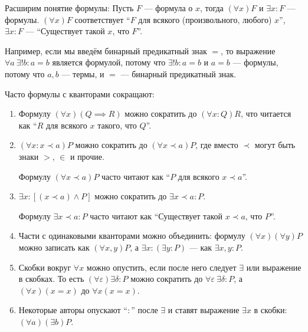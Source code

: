 Расширим понятие формулы: Пусть $F$ --- формула о $x$, тогда ${(\forall x)F}$
и ${\exists x:F}$ --- формулы. $(\forall x)F$ соответствует
``$F$ для всякого (произвольного, любого) $x$'', $\exists x:F$ ---
``Существует такой $x$, что $F$''.

Например, если мы введём бинарный предикатный знак $=$, то выражение
$\forall a~\exists!b:a=b$ является формулой, потому что ${\exists! b:a=b}$ и
${a=b}$ --- формулы, потому что $a,b$ --- термы, и $=$ --- бинарный предикатный знак.

Часто формулы с кванторами сокращают:
\begin{fullwidth}
	\begin{multicols}{2}
		\begin{enumerate}
			\item{}Формулу ${(\forall x)(Q\implies R)}$ можно сократить
			до ${(\forall x:Q)R}$, что читается как ``$R$ для всякого $x$ такого,
			что $Q$''.

			\item{}${(\forall x:x\prec a)P}$ можно сократить до ${(\forall x\prec a)P}$,
			где вместо $\prec$ могут быть знаки $>$, $\in$ и прочие.

			Формулу ${(\forall x\prec a)P}$ часто читают как
			``$P$ для всякого $x\prec a$''.

			\item{}$\exists x:[(x\prec a)\land P]$ можно сократить
			до $\exists x\prec a:P$.

			Формулу ${\exists x\prec a:P}$ часто читают как
			``Существует такой $x\prec a$, что $P$''.

			\columnbreak

			\item{}Части с одинаковыми кванторами можно объединить:
			формулу $(\forall x)(\forall y)P$ можно записать как $(\forall x,y)P$,
			а ${\exists x:(\exists y:P)}$ --- как $\exists x,y:P$.

			\item{}Скобки вокруг $\forall x$ можно опустить,
			если после него следует $\exists$ или выражение в скобках.
			То есть ${(\forall \varepsilon)\exists \delta:P}$
			можно сократить до $\forall \varepsilon~\exists \delta:P$,
			а $(\forall x)(x=x)$ до $\forall x(x=x)$.

			\item{}Некоторые авторы опускают ``$:$'' после $\exists$ и
			ставят выражение $\exists x$ в скобки: $(\forall a)(\exists b)P$.
		\end{enumerate}
	\end{multicols}
\end{fullwidth}

